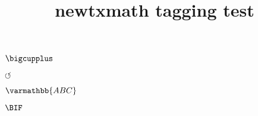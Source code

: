 \documentclass{article}
\title{newtxmath tagging test}
\begin{document}
\checkmark

\circledR

\maltese

\textsquare

$\bigcupplus$

$\circlearrowleft$

$\varmathbb{ABC}$

$\BIF$
\end{document}
